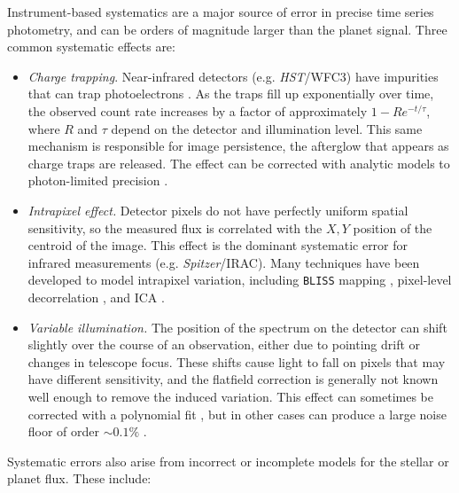 \documentclass[graybox,natbib,nosecnum]{svmult}
\newcommand{\project}[1]{\textsl{#1}}
\newcommand{\HST}{\project{HST}}
\newcommand{\Spitzer}{\project{Spitzer}}
\begin{document}
Instrument-based systematics are a major source of error in precise time series photometry, and can be orders of magnitude larger than the planet signal. Three common systematic effects are: 

\begin{itemize}
\item{\emph{Charge trapping}. Near-infrared detectors (e.g. \HST/WFC3) have impurities that can trap photoelectrons \citep{smith08}. As the traps fill up exponentially over time, the observed count rate increases by a factor of approximately $1 - R e^{-t/\tau}$, where $R$ and $\tau$ depend on the detector and illumination level.  This same mechanism is responsible for image persistence, the afterglow that appears as charge traps are released. The effect can be corrected with analytic models to photon-limited precision \citep{deming13, line16}. 
}
\item{\emph{Intrapixel effect.} Detector pixels do not have perfectly uniform spatial sensitivity, so the measured flux is correlated with the $X, Y$ position of the centroid of the image. This effect is the dominant systematic error for infrared measurements (e.g. \Spitzer/IRAC). Many techniques have been developed to model intrapixel variation, including \texttt{BLISS} mapping \citep{stevenson12}, pixel-level decorrelation \citep{deming15}, and ICA \citep{morello15}.}
\item{\emph{Variable illumination.} The position of the spectrum on the detector can shift slightly over the course of an observation, either due to pointing drift or changes in telescope focus. These shifts cause light to fall on pixels that may have different sensitivity, and the flatfield correction is generally not known well enough to remove the induced variation. This effect can sometimes be corrected with a polynomial fit \citep[e.g. for HST/STIS observations;][]{sing11}, but in other cases can produce a large noise floor of order $\sim0.1\%$ \citep[as for the old HST instrument NICMOS;][]{gibson11}.}
\end{itemize}

Systematic errors also arise from incorrect or incomplete models for the stellar or planet flux. These include: 
\end{document}
